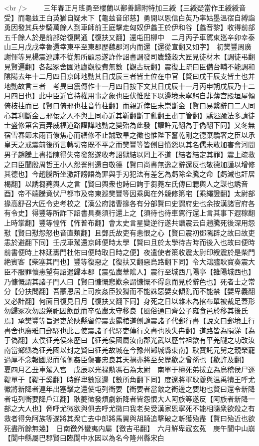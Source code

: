 <br />
　　三年春正月班勇至樓蘭以鄯善歸附特加三綬【三綬疑當作王綬綬音受】而龜兹王白英猶自疑未下【龜兹音邱慈】勇開以恩信白英乃率姑墨温宿自縛詣勇因發其兵步騎萬餘人到車師前王庭擊走匈奴伊蠡王於伊和谷【蠡音黎】收得前部五千餘人於是前部始復開通【復扶又翻】還屯田柳中　二月丙子車駕東廵辛卯幸泰山三月戊戌幸魯還幸東平至東郡歷魏郡河内而還【還從宣翻又如字】　初樊豐周廣謝惲等見楊震連諫不從無所顧忌遂詐作詔書調發司農錢穀大匠見徒材木【調徒弔翻見賢遍翻】各起冢舍園池廬觀役費無數【觀古玩翻】震復上疏曰臣備台輔不能調和隂陽去年十二月四日京師地動其日戊辰三者皆土位在中官【賢曰戊干辰支皆土也并地動故言三者　考異曰震傳作十一月四日按下文其日戊辰十一月丙申朔戊辰乃十二月四日也】此中臣近官持權用事之象也臣伏惟陛下以邊境未寧躬自菲薄宫殿垣屋傾倚枝拄而已【賢曰倚邪也拄音竹柱翻】而親近倖臣未崇斷金【賢曰易繫辭曰二人同心其利斷金言邪佞之人不與上同心近其靳翻斷丁亂翻王肅丁管翻】驕溢踰法多請徒士盛修第舍賣弄威福道路讙譁地動之變殆為此發【讙許元翻為于偽翻下同】又冬無宿雪春節未雨百僚焦心而繕修不止誠致旱之徵也惟陛下奮乾剛之德棄驕奢之臣以承皇天之戒震前後所言轉切帝既不平之而樊豐等皆側目憤怨以其名儒未敢加害會河間男子趙騰上書指陳得失帝發怒遂收考詔獄結以罔上不道【結者結定其罪】震上疏救之曰臣聞殷周哲王小人怨詈則還自敬德【賢曰尚書無逸之辭還反也敬德加謹以增修其德也】今趙騰所坐激訐謗語為罪與手刃犯法有差乞為虧除全騰之命【虧減也訐居楬翻】以誘芻蕘輿人之言【賢曰輿衆也詩曰詢于芻蕘左氏傳曰聼輿人之謀也誘音酉】帝不聼騰竟伏尸都市及帝東廵樊豐等因乘輿在外競修第宅【乘繩證翻】太尉部掾高舒召大匠令史考校之【漢公府諸曹掾各有分部賢曰史謂府史也余按漢諸官府各有令史】得豐等所詐下詔書具奏須行還上之【須待也待車駕行還上言其事下遐稼翻上時掌翻】豐等惶怖【怖普布翻】會太史言星變逆行遂共譛震云自趙騰死後深用怨懟【賢曰懟怨怒也音直類翻】且鄧氏故吏有恚恨之心【賢曰震初鄧隲辟之故曰故吏恚於避翻下同】壬戌車駕還京師便時太學【賢曰且於太學待吉時而後入也故曰便時前書便時上林延夀門杜佑曰便時取日時之便】夜遣使者策收震太尉印綬震於是柴門絶賓客【柴塞其門也】豐等復惡之【復扶又翻惡烏路翻下同】令大鴻臚耿寶奏震大臣不服罪懷恚望有詔遣歸本郡【震弘農華隂人】震行至城西几陽亭【雒陽城西也】乃慷慨謂其諸子門人曰【賢曰慷慨悲歎余謂慷慨不得意而見於辭色也】死者士之常分【分扶問翻】吾蒙恩居上司疾姦臣狡猾而不能誅惡嬖女傾亂而不能禁【嬖卑義翻又必計翻】何面目復見日月【復扶又翻下同】身死之日以雜木為捾布單被裁足蓋形勿歸冢次勿設祭祀因飲酖而卒弘農太守移良【風俗通曰齊公子雍食邑於移其後氏焉】承樊豐等旨遣吏於陜縣留停震喪露棺道側讁震諸子代郵行書【說文曰郵境上行書舍也廣雅曰郵驛也此言使震諸子代驛吏傳行文書也陜失冉翻】道路皆為隕涕【為于偽翻】太僕征羌侯來歷曰【征羌侯國屬汝南郡光武以歷曾祖歙有平羌隴之功改汝南當鄉縣為征羌國以封之賢曰征羌故城在今豫州郾城縣東南】耿寶託元舅之親榮寵過厚不念報國恩而傾側姦臣傷害忠良其天禍亦將至矣歷歙之曾孫也【歙許及翻】　夏四月乙丑車駕入宫　戊辰以光禄勲馮石為太尉　南單于檀死弟拔立為烏稽侯尸逐鞮單于【鞮于奚翻】時鮮卑數寇邊【數所角翻下同】度遼將軍耿夔與温禹犢王呼尤徽將新降者連年出塞擊之還使屯列衝要【衝要者當敵之衝邊之要地也賢曰還令新降者屯列衝要降戶江翻】耿夔徵發煩劇新降者皆怨恨大人阿族等遂反【阿族者新降一部之大人也】脅呼尤徽欲與俱去呼尤徽曰我老矣受漢家恩寧死不能相隨衆欲殺之有救者得免阿族等遂將其衆亡去中郎將馬翼與胡騎追擊破之斬獲殆盡【賢曰殆近也欲死盡所餘無幾】　日南徼外蠻夷内屬【徼吉弔翻】　六月鮮卑寇玄菟　庚午閬中山崩【閬中縣屬巴郡賢曰臨閬中水因以為名今隆州縣宋白